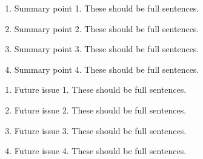\documentclass[letterpaper]{ar-1col}
\begin{document}




\begin{summary}
  \begin{enumerate}
    \item Summary point 1. These should be full sentences.
    \item Summary point 2. These should be full sentences.
    \item Summary point 3. These should be full sentences.
    \item Summary point 4. These should be full sentences.
  \end{enumerate}
\end{summary}

\begin{issues}
  \begin{enumerate}
    \item Future issue 1. These should be full sentences.
    \item Future issue 2. These should be full sentences.
    \item Future issue 3. These should be full sentences.
    \item Future issue 4. These should be full sentences.
  \end{enumerate}
\end{issues}
\end{document}
